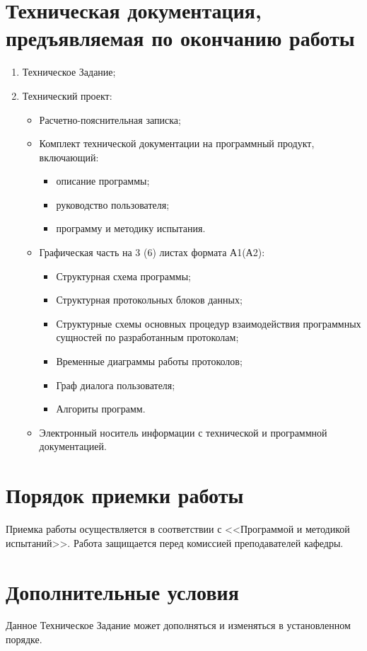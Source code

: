 \documentclass[14pt]{extarticle}
\begin{document}
\section{Техническая документация, предъявляемая по окончанию работы}
\begin{enumerate}
\item Техническое Задание;
\item Технический проект:
	\begin{itemize}
	\item Расчетно-пояснительная записка;
	\item Комплект технической документации на программный продукт, включающий:
		\begin{itemize}
		\item описание программы;
		\item руководство пользователя;
		\item программу и методику испытания.
		\end{itemize}

	\item Графическая часть на 3 (6) листах формата А1(А2):
		\begin{itemize}
		\item Структурная схема программы;
		\item Структурная протокольных блоков данных;
		\item Структурные схемы основных процедур взаимодействия программных сущностей по разработанным протоколам;
		\item Временные диаграммы работы протоколов;
		\item Граф диалога пользователя;
		\item Алгориты программ.
		\end{itemize}

	\item Электронный носитель информации с технической и программной документацией.
	\end{itemize}
\end{enumerate}

\section{Порядок приемки работы}
Приемка работы осуществляется в соответствии с <<Программой и методикой испытаний>>. Работа защищается перед комиссией преподавателей кафедры.

\section{Дополнительные условия}
Данное Техническое Задание может дополняться и изменяться в установленном порядке.
\end{document}
